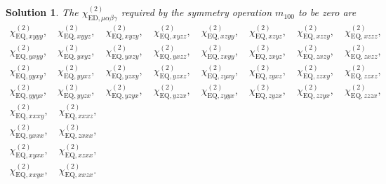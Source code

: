 \documentclass[UTF8,10pt,a4paper]{article}
\theoremstyle{Problem}
\theoremstyle{Solution}
\newtheorem*{sol}{Solution}
\begin{document}
\begin{sol}
    The $\chi_{\text{ED},\mu\alpha\beta\gamma}^{(2)}$ required by the symmetry operation $m_{100}$ to be zero are
    \small
    \begin{gather*}
        \chi_{\text{EQ},xyyy}^{(2)},\quad\chi_{\text{EQ},xyyz}^{(2)},\quad\chi_{\text{EQ},xyzy}^{(2)},\quad\chi_{\text{EQ},xyzz}^{(2)},\quad\chi_{\text{EQ},xzyy}^{(2)},\quad\chi_{\text{EQ},xzyz}^{(2)},\quad\chi_{\text{EQ},xzzy}^{(2)},\quad\chi_{\text{EQ},xzzz}^{(2)},\\
        \chi_{\text{EQ},yxyy}^{(2)},\quad\chi_{\text{EQ},yxyz}^{(2)},\quad\chi_{\text{EQ},yxzy}^{(2)},\quad\chi_{\text{EQ},yxzz}^{(2)},\quad\chi_{\text{EQ},zxyy}^{(2)},\quad\chi_{\text{EQ},zxyz}^{(2)},\quad\chi_{\text{EQ},zxzy}^{(2)},\quad\chi_{\text{EQ},zxzz}^{(2)},\\
        \chi_{\text{EQ},yyxy}^{(2)},\quad\chi_{\text{EQ},yyxz}^{(2)},\quad\chi_{\text{EQ},yzxy}^{(2)},\quad\chi_{\text{EQ},yzxz}^{(2)},\quad\chi_{\text{EQ},zyxy}^{(2)},\quad\chi_{\text{EQ},zyxz}^{(2)},\quad\chi_{\text{EQ},zzxy}^{(2)},\quad\chi_{\text{EQ},zzxz}^{(2)},\\
        \chi_{\text{EQ},yyyx}^{(2)},\quad\chi_{\text{EQ},yyzx}^{(2)},\quad\chi_{\text{EQ},yzyx}^{(2)},\quad\chi_{\text{EQ},yzzx}^{(2)},\quad\chi_{\text{EQ},zyyx}^{(2)},\quad\chi_{\text{EQ},zyzx}^{(2)},\quad\chi_{\text{EQ},zzyx}^{(2)},\quad\chi_{\text{EQ},zzzx}^{(2)},\\
        \chi_{\text{EQ},xxxy}^{(2)},\quad\chi_{\text{EQ},xxxz}^{(2)},\\
        \chi_{\text{EQ},yxxx}^{(2)},\quad\chi_{\text{EQ},zxxx}^{(2)},\\
        \chi_{\text{EQ},xyxx}^{(2)},\quad\chi_{\text{EQ},xzxx}^{(2)},\\
        \chi_{\text{EQ},xxyx}^{(2)},\quad\chi_{\text{EQ},xxzx}^{(2)}.
    \end{gather*}
    \normalsize





\end{sol}
\end{document}
